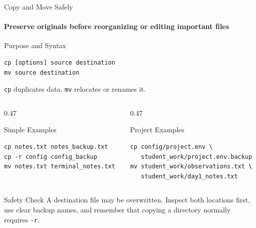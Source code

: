 \begin{frame}[fragile]{Copy and Move Safely}
\framesubtitle{Preserve originals before reorganizing or editing important files}

\footnotesize

\begin{block}{Purpose and Syntax}
\begin{verbatim}
cp [options] source destination
mv source destination
\end{verbatim}
\texttt{cp} duplicates data. \texttt{mv} relocates or renames it.
\end{block}

\begin{columns}[T,onlytextwidth]
    \begin{column}{0.47\textwidth}
        \begin{exampleblock}{Simple Examples}
\begin{verbatim}
cp notes.txt notes_backup.txt
cp -r config config_backup
mv notes.txt terminal_notes.txt
\end{verbatim}
        \end{exampleblock}
    \end{column}

    \begin{column}{0.47\textwidth}
        \begin{exampleblock}{Project Examples}
\begin{verbatim}
cp config/project.env \
   student_work/project.env.backup
mv student_work/observations.txt \
   student_work/day1_notes.txt
\end{verbatim}
        \end{exampleblock}
    \end{column}
\end{columns}

\vspace{-0.51cm}
\begin{alertblock}{Safety Check}
A destination file may be overwritten. Inspect both locations first, use clear
backup names, and remember that copying a directory normally requires \texttt{-r}.
\end{alertblock}
\end{frame}

